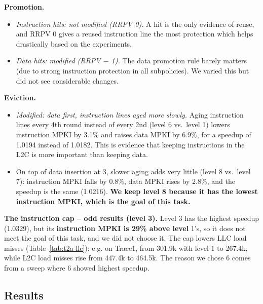 \textbf{Promotion.}
\begin{itemize}
  \item \emph{Instruction hits: not modified (RRPV 0).} A hit is the only evidence of reuse, and RRPV 0 gives a reused instruction line the most protection which helps drastically based on the experiments.
  \item \emph{Data hits: modified (RRPV $-$ 1).} The data promotion rule barely matters (due to strong instruction protection in all subpolicies). We varied this but did not see considerable changes.
\end{itemize}

\textbf{Eviction.}
\begin{itemize}
  \item \emph{Modified: data first, instruction lines aged more slowly.} Aging instruction lines every 4th round instead of every 2nd (level 6 vs.\ level 1) lowers instruction MPKI by 3.1\% and raises data MPKI by 6.9\%, for a speedup of 1.0194 instead of 1.0182. This is evidence that keeping instructions in the L2C is more important than keeping data.
  \item On top of data insertion at 3, slower aging adds very little (level 8 vs.\ level 7): instruction MPKI falls by 0.8\%, data MPKI rises by 2.8\%, and the speedup is the same (1.0216). \textbf{We keep level 8 because it has the lowest instruction MPKI, which is the goal of this task.}
\end{itemize}

\textbf{The instruction cap -- odd results (level 3).} Level 3 has the highest speedup (1.0329), but its \textbf{instruction MPKI is 29\% above level} 1's, so it does not meet the goal of this task, and we did not choose it. The cap lowers LLC load misses (Table~\ref{tab:t2a-llc}): e.g. on Trace1, from 301.9k with level 1 to 267.4k, while L2C load misses rise from 447.4k to 464.5k. The reason we chose $6$ comes from a sweep where $6$ showed highest speedup.

\begin{table}[H]
\centering
\small

\caption{L2C load misses and LLC load hits and misses, in thousands, over the 25M simulated instructions.}\label{tab:t2a-llc}
\end{table}

\subsection{Results}

\begin{table}[H]
\centering
\small

\caption{IPC, speedup over LRU, and L2C load MPKI (total, instruction, data). L2C load MPKI is the sum of instruction and data load MPKI. Mean: geometric for speedup, arithmetic otherwise.}
\end{table}

